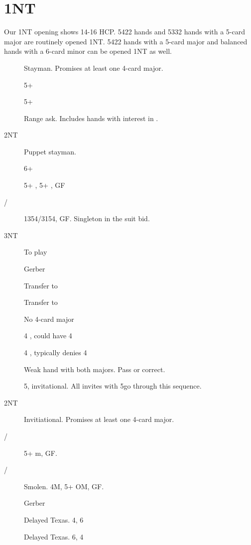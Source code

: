 \documentclass[tom-ari]{subfiles}
\begin{document}
\chapter{1NT}

Our 1NT opening shows 14-16 HCP. 5422 hands and 5332 hands with a 5-card major are routinely opened 1NT.
5422 hands with a 5-card major and balanced hands with a 6-card minor can be opened 1NT as well.

\begin{description}
  \item[] Stayman. Promises at least one 4-card major.
  \item[] 5+ \heartsuit
  \item[] 5+ \spadesuit
  \item[] Range ask. Includes hands with interest in \clubsuit.
  \item[2NT] Puppet stayman.
  \item[] 6+ \diamondsuit
  \item[] 5+ \diamondsuit, 5+ \clubsuit, GF
  \item[/] 1354/3154, GF. Singleton in the suit bid.
  \item[3NT] To play
  \item[] Gerber
  \item[] Transfer to \heartsuit
  \item[] Transfer to \spadesuit
\end{description}

\begin{description}
  \item[] No 4-card major
  \item[] 4 \heartsuit, could have 4 \spadesuit
  \item[] 4 \spadesuit, typically denies 4 \heartsuit
\end{description}

\begin{description}
  \item[] Weak hand with both majors. Pass or correct.
  \item[] 5\spadesuit, invitational. All invites with 5\spadesuit go through this sequence.
  \item[2NT] Invitiational. Promises at least one 4-card major.
  \item[/] 5+ m, GF.
  \item[/] Smolen. 4M, 5+ OM, GF.
  \item[] Gerber
  \item[] Delayed Texas. 4\spadesuit, 6\heartsuit
  \item[] Delayed Texas. 6\spadesuit, 4\heartsuit
\end{description}
\end{document}
